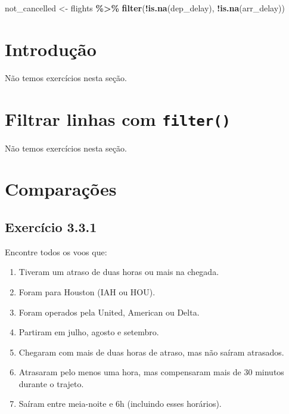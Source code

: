 \documentclass[
]{latex/krantz}
\newenvironment{Shaded}{\begin{snugshade}}{\end{snugshade}}
\newcommand{\FunctionTok}[1]{\textcolor[rgb]{0.13,0.29,0.53}{\textbf{#1}}}
\newcommand{\NormalTok}[1]{#1}
\newcommand{\OtherTok}[1]{\textcolor[rgb]{0.56,0.35,0.01}{#1}}
\newcommand{\SpecialCharTok}[1]{\textcolor[rgb]{0.81,0.36,0.00}{\textbf{#1}}}
\providecommand{\tightlist}{%
  \setlength{\itemsep}{0pt}\setlength{\parskip}{0pt}}
\theoremstyle{definition}
\theoremstyle{definition}
\theoremstyle{definition}
\theoremstyle{definition}
\theoremstyle{remark}
\begin{document}
\begin{Shaded}
\begin{Highlighting}[]
\NormalTok{not\_cancelled }\OtherTok{\textless{}{-}}\NormalTok{ flights }\SpecialCharTok{\%\textgreater{}\%}
                    \FunctionTok{filter}\NormalTok{(}\SpecialCharTok{!}\FunctionTok{is.na}\NormalTok{(dep\_delay), }\SpecialCharTok{!}\FunctionTok{is.na}\NormalTok{(arr\_delay))}
\end{Highlighting}
\end{Shaded}

\hypertarget{introduuxe7uxe3o-1}{%
\section{Introdução}\label{introduuxe7uxe3o-1}}

Não temos exercícios nesta seção.

\hypertarget{filtrar-linhas-com-filter}{%
\section{\texorpdfstring{Filtrar linhas com \texttt{filter()}}{Filtrar linhas com filter()}}\label{filtrar-linhas-com-filter}}

Não temos exercícios nesta seção.

\hypertarget{comparauxe7uxf5es}{%
\section{Comparações}\label{comparauxe7uxf5es}}

\hypertarget{exr3-3-1}{%
\subsection*{Exercício 3.3.1}\label{exr3-3-1}}

Encontre todos os voos que:

\begin{enumerate}
\def\labelenumi{\alph{enumi}.}
\tightlist
\item
  Tiveram um atraso de duas horas ou mais na chegada.
\item
  Foram para Houston (IAH ou HOU).
\item
  Foram operados pela United, American ou Delta.
\item
  Partiram em julho, agosto e setembro.
\item
  Chegaram com mais de duas horas de atraso, mas não saíram atrasados.
\item
  Atrasaram pelo menos uma hora, mas compensaram mais de 30 minutos durante o trajeto.
\item
  Saíram entre meia-noite e 6h (incluindo esses horários).
\end{enumerate}
\end{document}
